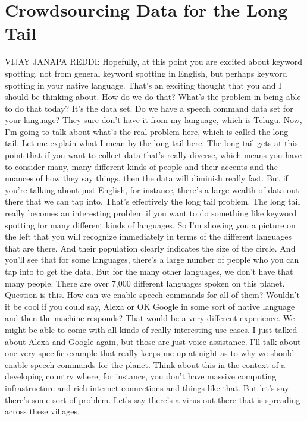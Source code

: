 \section{Crowdsourcing Data for the Long Tail}

VIJAY JANAPA REDDI: Hopefully, at this point
you are excited about keyword spotting, not
from general keyword spotting in English,
but perhaps keyword spotting in your native language.
That's an exciting thought that you and I should be thinking about.
How do we do that?
What's the problem in being able to do that today?
It's the data set.
Do we have a speech command data set for your language?
They sure don't have it from my language, which is Telugu.
Now, I'm going to talk about what's the real problem here,
which is called the long tail.
Let me explain what I mean by the long tail here.
The long tail gets at this point that if you
want to collect data that's really diverse,
which means you have to consider many, many different kinds of people
and their accents and the nuances of how they say things,
then the data will diminish really fast.
But if you're talking about just English, for instance,
there's a large wealth of data out there that we can tap into.
That's effectively the long tail problem.
The long tail really becomes an interesting problem
if you want to do something like keyword spotting
for many different kinds of languages.
So I'm showing you a picture on the left that you will recognize immediately
in terms of the different languages that are there.
And their population clearly indicates the size of the circle.
And you'll see that for some languages, there's
a large number of people who you can tap into to get the data.
But for the many other languages, we don't have that many people.
There are over 7,000 different languages spoken on this planet.
Question is this.
How can we enable speech commands for all of them?
Wouldn't it be cool if you could say, Alexa or OK
Google in some sort of native language and then the machine responds?
That would be a very different experience.
We might be able to come with all kinds of really interesting use cases.
I just talked about Alexa and Google again,
but those are just voice assistance.
I'll talk about one very specific example that really keeps me up
at night as to why we should enable speech commands for the planet.
Think about this in the context of a developing country
where, for instance, you don't have massive computing
infrastructure and rich internet connections and things like that.
But let's say there's some sort of problem.
Let's say there's a virus out there that is spreading across these villages.
